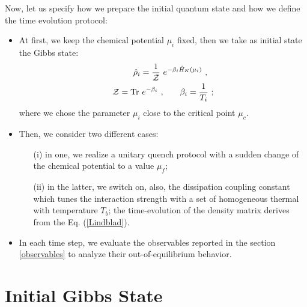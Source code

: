 \documentclass[pra,twocolumn,preprintnumbers,amsmath,amssymb,nofootinbib,floatfix,longbibliography]{revtex4}
\begin{document}
Now, let us specify how we prepare the initial quantum
state and how we define the time evolution protocol:
\begin{itemize}
  \item
  At first, we keep the chemical potential $\mu_i$ fixed,
  then we take as initial state the Gibbs state:
  \begin{align}
	\label{Gibbs}
	\hat \rho_i  = \frac{1}{\cal Z} \,\,&
	e^{-\beta_i \hat H_K(\mu_i)} \,\,,\\
    {\cal Z} = {\rm Tr} \,\,e^{-\beta_i } \,\,, & \qquad
	\beta_i  = \frac{1}{T_i} \,\,;
  \end{align}
  where we chose the parameter $\mu_i$ close to the
  critical point $\mu_c$.

  \item
  Then, we consider two different cases:
  \begin{itemize}
    \item[(i)]
    in one, we realize a unitary quench protocol with a
    sudden change of the chemical potential to a value
    $\mu_f$;

    \item[(ii)]
    in the latter, we switch on, also, the dissipation
    coupling constant which tunes the interaction strength
    with a set of homogeneous thermal with temperature
    $T_b$; the time-evolution of the density matrix derives
    from the Eq. (\ref{Lindblad}).
  \end{itemize}

  \item
  In each time step, we evaluate the observables reported
  in the section \ref{observables} to analyze their
  out-of-equilibrium behavior.
\end{itemize}



\section{Initial Gibbs State}
\end{document}

